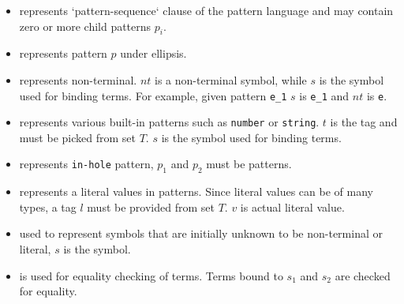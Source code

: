 \begin{itemize}
\item
\PatternSequence represents `pattern-sequence` clause of the pattern language and may contain zero or more child patterns $p_i$.

\item 
\Repeat represents pattern $p$ under ellipsis.

\item 
\Nt represents non-terminal. $nt$ is a non-terminal symbol, while $s$ is the symbol used for binding terms. For example, given pattern \texttt{e\_1} $s$ is \texttt{e\_1} and $nt$ is \texttt{e}.
\item
\BuiltInPattern represents various built-in patterns such as \texttt{number} or \texttt{string}. $t$ is the tag and must be picked from set $T$. $s$ is the symbol used for binding terms.

\item
\InHolePattern represents \texttt{in-hole} pattern, $p_1$ and $p_2$ must be patterns.

\item 
\LiteralPattern represents a literal values in patterns. Since literal values can be of many types, a tag $l$ must be provided from set $T$. $v$ is actual literal value.

\item 
\UnresolvedSymbol used to represent symbols that are initially unknown to be non-terminal or literal, $s$ is the symbol.

\item
\CheckConstraint is used for equality checking of terms. Terms bound to $s_1$ and $s_2$ are checked for equality.

\end{itemize}

